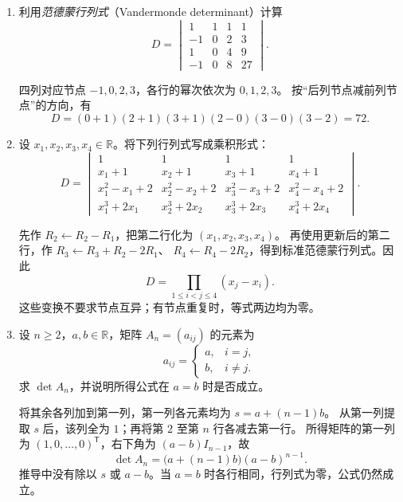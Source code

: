 \documentclass[UTF8,12pt,a4paper,fontset=fandol]{ctexart}
\begin{document}
\begin{enumerate}[label=\arabic*.,resume=detquestions]
\item\label{q:vandermonde-numeric}
利用\emph{范德蒙行列式}（Vandermonde determinant）计算
\[
D=\begin{vmatrix}
1&1&1&1\\-1&0&2&3\\1&0&4&9\\-1&0&8&27
\end{vmatrix}.
\]
\begin{solve}
四列对应节点 $-1,0,2,3$，各行的幂次依次为 $0,1,2,3$。
按“后列节点减前列节点”的方向，有
\[
D=(0+1)(2+1)(3+1)(2-0)(3-0)(3-2)=72.
\]
\end{solve}

\item\label{q:polynomial-four}
设 $x_1,x_2,x_3,x_4\in\mathbb R$。将下列行列式写成乘积形式：
\[
D=\begin{vmatrix}
1&1&1&1\\
x_1+1&x_2+1&x_3+1&x_4+1\\
x_1^2-x_1+2&x_2^2-x_2+2&x_3^2-x_3+2&x_4^2-x_4+2\\
x_1^3+2x_1&x_2^3+2x_2&x_3^3+2x_3&x_4^3+2x_4
\end{vmatrix}.
\]
\begin{solve}
先作 $R_2\leftarrow R_2-R_1$，把第二行化为 $(x_1,x_2,x_3,x_4)$。
再使用更新后的第二行，作 $R_3\leftarrow R_3+R_2-2R_1$、
$R_4\leftarrow R_4-2R_2$，得到标准范德蒙行列式。因此
\[
D=\prod_{1\leq i<j\leq4}(x_j-x_i).
\]
这些变换不要求节点互异；有节点重复时，等式两边均为零。
\end{solve}

\item\label{q:constant-off-diagonal}
设 $n\geq2$，$a,b\in\mathbb R$，矩阵 $A_n=(a_{ij})$ 的元素为
\[
a_{ij}=\begin{cases}a,&i=j,\\b,&i\ne j.\end{cases}
\]
求 $\det A_n$，并说明所得公式在 $a=b$ 时是否成立。
\begin{solve}
将其余各列加到第一列，第一列各元素均为 $s=a+(n-1)b$。
从第一列提取 $s$ 后，该列全为 $1$；再将第 $2$ 至第 $n$ 行各减去第一行。
所得矩阵的第一列为 $(1,0,\ldots,0)^{\mathsf T}$，右下角为 $(a-b)I_{n-1}$，故
\[
\boxed{\det A_n=\bigl(a+(n-1)b\bigr)(a-b)^{n-1}.}
\]
推导中没有除以 $s$ 或 $a-b$。当 $a=b$ 时各行相同，行列式为零，公式仍然成立。
\end{solve}


\end{enumerate}
\end{document}
